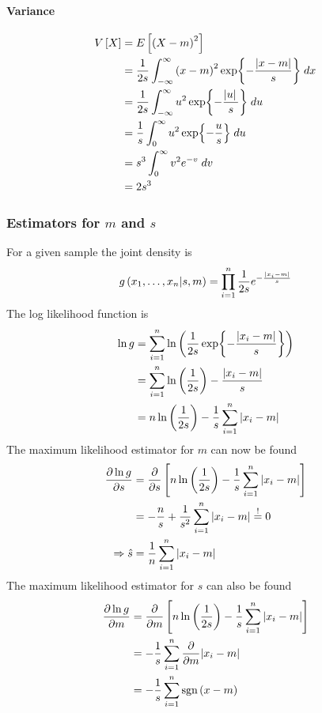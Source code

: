 \paragraph{Variance}
\begin{align}
    V\left[X\right]&=E\left[\left(X-m\right)^2\right]
    \\&=\frac{1}{2s}\int_{-\infty}^{\infty}\left(x-m\right)^2\exp{-\frac{\abs{x-m}}{s}}\;dx
    \\&=\frac{1}{2s}\int_{-\infty}^{\infty} u^2\exp{-\frac{\abs*{u}}{s}}\;du
    \\&=\frac{1}{s}\int_0^\infty u^2\exp{-\frac{u}{s}}\;du
    \\&=s^3\int_0^\infty v^2 e^{-v}\;dv
    \\&=2s^3
\end{align}
\subsubsection{Estimators for $m$ and $s$}
For a given sample the joint density is
\begin{align}
    g\left(x_1,\dots,x_n\vert s,m\right)=\prod_{i=1}^{n}\frac{1}{2s}e^{-\frac{\abs*{x_i-m}}{s}}
\end{align}
The log likelihood function is
\begin{align}
    \ln g &= \sum_{i=1}^n \ln\left(\frac{1}{2s}\exp{-\frac{\abs{x_i-m}}{s}}\right)
    \\&=\sum_{i=1}^{n}\ln\left(\frac{1}{2s}\right)-\frac{\abs{x_i-m}}{s}
    \\&=n\ln\left(\frac{1}{2s}\right)-\frac{1}{s}\sum_{i=1}^n\abs{x_i-m}
\end{align}
The maximum likelihood estimator for $m$ can now be found
\begin{align}
    \pdv{\ln g}{s}&=\pdv{s}\left[n\ln\left(\frac{1}{2s}\right)-\frac{1}{s}\sum_{i=1}^n\abs{x_i-m}\right]
    \\&=-\frac{n}{s}+\frac{1}{s^2}\sum_{i=1}^n\abs{x_i-m}\overset{!}{=}0
    \\\Rightarrow \hat{s}&=\frac{1}{n}\sum_{i=1}^n\abs{x_i-m}
\end{align}
The maximum likelihood estimator for $s$ can also be found
\begin{align}
    \pdv{\ln g}{m}&=\pdv{m}\left[n\ln\left(\frac{1}{2s}\right)-\frac{1}{s}\sum_{i=1}^n\abs{x_i-m}\right]
    \\&=-\frac{1}{s}\sum_{i=1}^n\pdv{m}\abs{x_i-m}
    \\&=-\frac{1}{s}\sum_{i=1}^n \text{sgn}\left(x-m\right)
\end{align}

